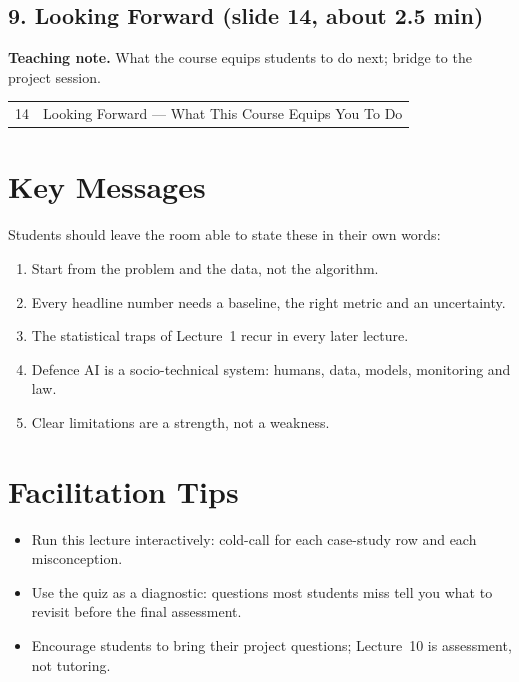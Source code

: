 \documentclass[11pt]{article}
\begin{document}
\subsection{9. Looking Forward \normalfont\small\color{GreyN}(slide 14, about 2.5 min)}

\textbf{Teaching note.} What the course equips students to do next; bridge to the project session.

\begin{center}\small\renewcommand{\arraystretch}{1.1}\begin{tabularx}{\textwidth}{@{}r X@{}}14 & Looking Forward --- What This Course Equips You To Do\\\end{tabularx}\end{center}

\section{Key Messages}Students should leave the room able to state these in their own words:\begin{keypoint}\begin{enumerate}\item Start from the problem and the data, not the algorithm.\item Every headline number needs a baseline, the right metric and an uncertainty.\item The statistical traps of Lecture~1 recur in every later lecture.\item Defence AI is a socio-technical system: humans, data, models, monitoring and law.\item Clear limitations are a strength, not a weakness.\end{enumerate}\end{keypoint}

\section{Facilitation Tips}\begin{itemize}\item Run this lecture interactively: cold-call for each case-study row and each misconception.\item Use the quiz as a diagnostic: questions most students miss tell you what to revisit before the final assessment.\item Encourage students to bring their project questions; Lecture~10 is assessment, not tutoring.\end{itemize}
\end{document}
